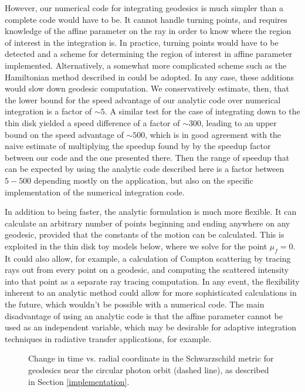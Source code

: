 \documentclass[apj]{emulateapj}
\begin{document}
However, our numerical code for integrating geodesics is much simpler than a complete code would have to be. It cannot handle turning points, and requires knowledge of the affine parameter on the ray in order to know where the region of interest in the integration is. In practice, turning points would have to be detected and a scheme for determining the region of interest in affine parameter implemented. Alternatively, a somewhat more complicated scheme such as the Hamiltonian method described in \citet{schnittman2004} could be adopted. In any case, these additions would slow down geodesic computation. We conservatively estimate, then, that the lower bound for the speed advantage of our analytic code over numerical integration is a factor of $\sim 5$. A similar test for the case of integrating down to the thin disk yielded a speed difference of a factor of $\sim 300$, leading to an upper bound on the speed advantage of $\sim 500$, which is in good agreement with the naive estimate of multiplying the speedup found by \citet{agolphd} by the speedup factor between our code and the one presented there. Then the range of speedup that can be expected by using the analytic code described here is a factor between $5-500$ depending mostly on the application, but also on the specific implementation of the numerical integration code.

In addition to being faster, the analytic formulation is much more flexible. It can calculate an arbitrary number of points beginning and ending anywhere on any geodesic, provided that the constants of the motion can be calculated. This is exploited in the thin disk toy models below, where we solve for the point $\mu_f=0$. It could also allow, for example, a calculation of Compton scattering by tracing rays out from every point on a geodesic, and computing the scattered intensity into that point as a separate ray tracing computation. In any event, the flexibility inherent to an analytic method could allow for more sophisticated calculations in the future, which wouldn't be possible with a numerical code. The main disadvantage of using an analytic code is that the affine parameter cannot be used as an independent variable, which may be desirable for adaptive integration techniques in radiative transfer applications, for example.

\begin{figure}
\caption{\label{prettytime}Change in time vs. radial coordinate in the Schwarzschild metric for geodesics near the circular photon orbit (dashed line), as described in Section \ref{implementation}.}
\end{figure}
\end{document}
